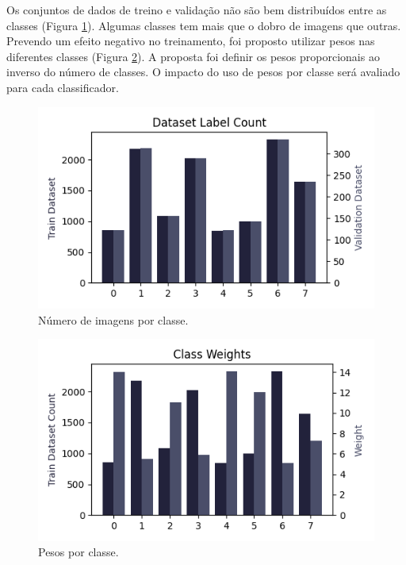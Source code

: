 \documentclass[final,5p]{elsarticle}
\numberwithin{equation}{section}
\begin{document}
    Os conjuntos de dados de treino e validação não são bem distribuídos entre as classes (Figura \ref{fig:AmostrasContagem}). Algumas classes tem mais que o dobro de imagens que outras. Prevendo um efeito negativo no treinamento, foi proposto utilizar pesos nas diferentes classes (Figura \ref{fig:AmostrasPesos}). A proposta foi definir os pesos proporcionais ao inverso do número de classes. O impacto do uso de pesos por classe será avaliado para cada classificador.

        \begin{figure}[hbt!]
            \includegraphics[width=0.95\columnwidth]{Samples_count.png}
            \caption{Número de imagens por classe.}\label{fig:AmostrasContagem}
        \end{figure}

        \begin{figure}[hbt!]
            \includegraphics[width=0.95\columnwidth]{Samples_weights.png}
            \caption{Pesos por classe.}\label{fig:AmostrasPesos}
        \end{figure}
\end{document}
